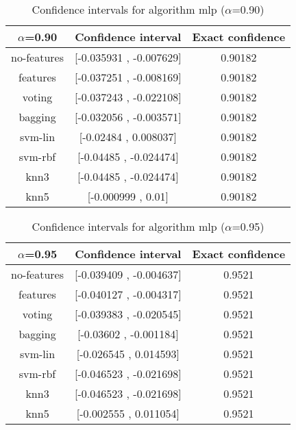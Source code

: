 \documentclass[a4paper,10pt]{article}
\begin{document}
\begin{table}[!htp]
\centering\small
\begin{tabular}{
|c|c|c|}
\hline
 $\alpha$=0.90 & Confidence interval & Exact confidence \\ \hline 
no-features & [-0.035931 , -0.007629] & 0.90182\\ \hline 
features & [-0.037251 , -0.008169] & 0.90182\\ \hline 
voting & [-0.037243 , -0.022108] & 0.90182\\ \hline 
bagging & [-0.032056 , -0.003571] & 0.90182\\ \hline 
svm-lin & [-0.02484 , 0.008037] & 0.90182\\ \hline 
svm-rbf & [-0.04485 , -0.024474] & 0.90182\\ \hline 
knn3 & [-0.04485 , -0.024474] & 0.90182\\ \hline 
knn5 & [-0.000999 , 0.01] & 0.90182\\ \hline 

\end{tabular}
\caption{Confidence intervals for algorithm mlp ($\alpha$=0.90)}
\end{table}
\begin{table}[!htp]
\centering\small
\begin{tabular}{
|c|c|c|}
\hline
 $\alpha$=0.95 & Confidence interval & Exact confidence \\ \hline 
no-features & [-0.039409 , -0.004637] & 0.9521\\ \hline 
features & [-0.040127 , -0.004317] & 0.9521\\ \hline 
voting & [-0.039383 , -0.020545] & 0.9521\\ \hline 
bagging & [-0.03602 , -0.001184] & 0.9521\\ \hline 
svm-lin & [-0.026545 , 0.014593] & 0.9521\\ \hline 
svm-rbf & [-0.046523 , -0.021698] & 0.9521\\ \hline 
knn3 & [-0.046523 , -0.021698] & 0.9521\\ \hline 
knn5 & [-0.002555 , 0.011054] & 0.9521\\ \hline 

\end{tabular}
\caption{Confidence intervals for algorithm mlp ($\alpha$=0.95)}
\end{table}

 \clearpage 
\end{document}
